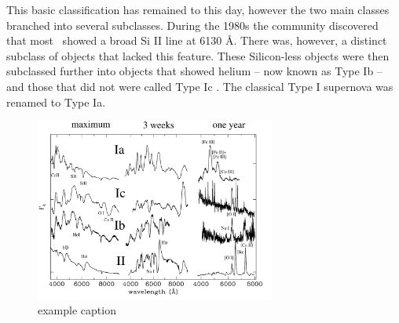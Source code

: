 This basic classification has remained to this day, however the two main classes branched into several subclasses.
During the 1980s the community discovered that most \sneia\ showed a broad Si II line at 6130 \AA. There was, however, a distinct subclass of objects that lacked this feature. These Silicon-less objects were then subclassed further into objects that showed helium -- now known as Type Ib --  and those that did not were called Type Ic \citep[see spectra in Figure \ref{fig:sn_classification};]{1987ApJ...317..355H, 1986ApJ...306L..77G}. The classical Type I supernova was renamed to Type Ia. 

\begin{figure}[htb] %
   \centering
   \includegraphics[width=0.7\textwidth]{chapter_intro/plots/sn_class_spectra.pdf} 
   \caption{example caption}
   \label{fig:sn_class_spectra}
\end{figure}


